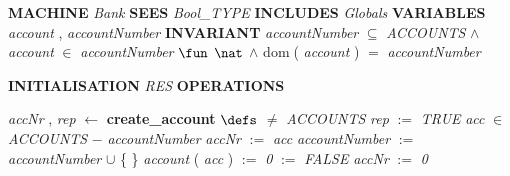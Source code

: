 %
\bsetindent
\begin{tabbing}
\bSetTabs
%
%
\bbnl
{\bf MACHINE} \+ \bbnl
{\em Bank\/} \-\label{Bank}
%
%
\bbnl
{\bf SEES} \+ \bbnl
{\em Bool\_TYPE\/}\label{Bool_TYPE}  \-
%
%
\bbnl
{\bf INCLUDES} \+ \bbnl
{\em Globals\/}\label{Globals}  \-
%
%
\bbnl
{\bf VARIABLES} \+ \bbnl
{\em account\/}\label{account}  , {\em accountNumber\/}\label{accountNumber}  \-
%
%
\bbnl
{\bf INVARIANT} \+ \bbnl
{\em accountNumber\/} $\subseteq$ {\em ACCOUNTS\/}\label{ACCOUNTS}  $\wedge$ \bnl
{\em account\/} $\in$ {\em accountNumber\/} $\fun$  $\nat$  $\wedge$ \bnl
{\sf dom}$\;$( {\em account\/} )  $=$ {\em accountNumber\/}
\end{tabbing}
\bresetindent
%
%
\vspace{-4.5ex}\bsetindent
\begin{tabbing}
\bSetTabs
\+\> \-
%
%
\bbnl
{\bf INITIALISATION} \+ \bbnl
{\em RES\/} \-
%
%
\bnl\bnl
{\bf OPERATIONS} \+ \bbnl

%
%
{\em accNr\/} , {\em rep\/} $\longleftarrow$  {\bf { create\_account}}  \bhsp $\defs$ \+ \bnl
   $\neq$ {\em ACCOUNTS\/}\label{ACCOUNTS}  \- \bhsp {} \+\bnl
{\em rep\/} $:=$  {\em TRUE\/} \bparallel \bnl
{}  \-\bnl
{} \+\bnl
{\em acc\/} $\in$ {\em ACCOUNTS\/}\label{ACCOUNTS}  $-$ {\em accountNumber\/} \-\bnl
{} \+\bnl
{\em accNr\/} $:=$  {\em acc\/} \bparallel \bnl
{\em accountNumber\/} $:=$  {\em accountNumber\/} $\cup$  \{  \- \}  \bparallel \bnl
{\em account\/} ( {\em acc\/} )  $:=$  {\em 0\/} \-\bnl
{}  \-\bnl
{}  $:=$  {\em FALSE\/} \bparallel \bnl
{\em accNr\/} $:=$  {\em 0\/} \-\bnl
{}  \- \bOperationSemiColon 
\end{tabbing}
